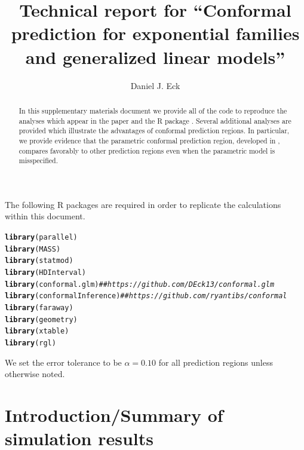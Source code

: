\documentclass[11pt]{article}\usepackage[]{graphicx}\usepackage[]{color}
\title{Technical report for ``Conformal prediction for exponential 
  families and generalized linear models''}
\author{Daniel J. Eck}
\makeatletter
\newcommand{\hlcom}[1]{\textcolor[rgb]{0.678,0.584,0.686}{\textit{#1}}}%
\newcommand{\hlstd}[1]{\textcolor[rgb]{0.345,0.345,0.345}{#1}}%
\newcommand{\hlkwd}[1]{\textcolor[rgb]{0.737,0.353,0.396}{\textbf{#1}}}%
\newenvironment{kframe}{%
 \def\at@end@of@kframe{}%
 \ifinner\ifhmode%
  \def\at@end@of@kframe{\end{minipage}}%
  \begin{minipage}{\columnwidth}%
 \fi\fi%
 \def\FrameCommand##1{\hskip\@totalleftmargin \hskip-\fboxsep
 \colorbox{shadecolor}{##1}\hskip-\fboxsep
     \hskip-\linewidth \hskip-\@totalleftmargin \hskip\columnwidth}%
 \MakeFramed {\advance\hsize-\width
   \@totalleftmargin\z@ \linewidth\hsize
   \@setminipage}}%
 {\par\unskip\endMakeFramed%
 \at@end@of@kframe}
\newenvironment{knitrout}{}{} %
\makeatother
\begin{document}
\maketitle

\begin{abstract}
In this supplementary materials document we provide all of the code to 
reproduce the analyses which appear in the paper \citet{eck2019conformal} and 
the R package \citet{eck2018conformalR}.  Several additional analyses are 
provided which illustrate the advantages of conformal prediction regions.  In 
particular, we provide evidence that the parametric conformal prediction 
region, developed in \citet{eck2019conformal}, compares favorably to other 
prediction regions even when the parametric model is misspecified.  
\end{abstract}

\vspace*{0.5cm}

\tableofcontents

\vspace*{0.5cm}

The following R packages are required in order to replicate the calculations 
within this document. 

\begin{knitrout}
\color{fgcolor}\begin{kframe}
\begin{alltt}
\hlkwd{library}\hlstd{(parallel)}
\hlkwd{library}\hlstd{(MASS)}
\hlkwd{library}\hlstd{(statmod)}
\hlkwd{library}\hlstd{(HDInterval)}
\hlkwd{library}\hlstd{(conformal.glm)} \hlcom{## https://github.com/DEck13/conformal.glm}
\hlkwd{library}\hlstd{(conformalInference)} \hlcom{## https://github.com/ryantibs/conformal}
\hlkwd{library}\hlstd{(faraway)}
\hlkwd{library}\hlstd{(geometry)}
\hlkwd{library}\hlstd{(xtable)}
\hlkwd{library}\hlstd{(rgl)}
\end{alltt}
\end{kframe}
\end{knitrout}

We set the error tolerance to be $\alpha = 0.10$ for all prediction regions 
unless otherwise noted.


\section{Introduction/Summary of simulation results}
\end{document}
